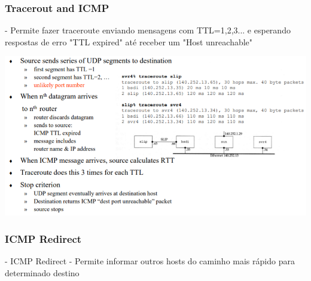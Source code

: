 \documentclass[../resumosRCOM.tex]{subfiles}
\begin{document}
\subsubsection{Tracerout and ICMP}
- Permite fazer traceroute enviando mensagens com TTL=1,2,3... e esperando respostas de erro	"TTL expired" até receber um "Host unreachable"
\begin{center}
    \includegraphics[width=14cm]{images/RCOM31.png}
\end{center}

\subsubsection{ICMP Redirect}
- ICMP Redirect - Permite informar outros hosts do caminho mais rápido para determinado destino
\end{document}
